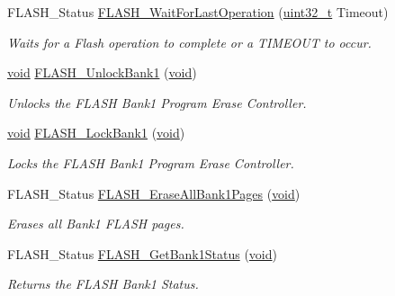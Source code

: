 \begin{DoxyCompactItemize}
F\-L\-A\-S\-H\-\_\-\-Status \hyperlink{group___f_l_a_s_h___exported___functions_ga2ad803999ae93ec03700983c59cae264}{F\-L\-A\-S\-H\-\_\-\-Wait\-For\-Last\-Operation} (\hyperlink{stdint_8h_a435d1572bf3f880d55459d9805097f62}{uint32\-\_\-t} Timeout)
\begin{DoxyCompactList}\small\item\em Waits for a Flash operation to complete or a T\-I\-M\-E\-O\-U\-T to occur. \end{DoxyCompactList}\item 
\hyperlink{group___n_a_m_e_ga18028b8badbf1ea7e704ccac3c488e82}{void} \hyperlink{group___f_l_a_s_h___exported___functions_ga358c4b7e0ef20693ca62cc9d20c94a5a}{F\-L\-A\-S\-H\-\_\-\-Unlock\-Bank1} (\hyperlink{group___n_a_m_e_ga18028b8badbf1ea7e704ccac3c488e82}{void})
\begin{DoxyCompactList}\small\item\em Unlocks the F\-L\-A\-S\-H Bank1 Program Erase Controller. \end{DoxyCompactList}\item 
\hyperlink{group___n_a_m_e_ga18028b8badbf1ea7e704ccac3c488e82}{void} \hyperlink{group___f_l_a_s_h___exported___functions_gafe4188ab9eb12c046970660f65a3faf9}{F\-L\-A\-S\-H\-\_\-\-Lock\-Bank1} (\hyperlink{group___n_a_m_e_ga18028b8badbf1ea7e704ccac3c488e82}{void})
\begin{DoxyCompactList}\small\item\em Locks the F\-L\-A\-S\-H Bank1 Program Erase Controller. \end{DoxyCompactList}\item 
F\-L\-A\-S\-H\-\_\-\-Status \hyperlink{group___f_l_a_s_h___exported___functions_ga2036728450ee18e789b25fe3fd9c80ee}{F\-L\-A\-S\-H\-\_\-\-Erase\-All\-Bank1\-Pages} (\hyperlink{group___n_a_m_e_ga18028b8badbf1ea7e704ccac3c488e82}{void})
\begin{DoxyCompactList}\small\item\em Erases all Bank1 F\-L\-A\-S\-H pages. \end{DoxyCompactList}\item 
F\-L\-A\-S\-H\-\_\-\-Status \hyperlink{group___f_l_a_s_h___exported___functions_ga9d5b76b75ef4c578cc45dc836a1929b6}{F\-L\-A\-S\-H\-\_\-\-Get\-Bank1\-Status} (\hyperlink{group___n_a_m_e_ga18028b8badbf1ea7e704ccac3c488e82}{void})
\begin{DoxyCompactList}\small\item\em Returns the F\-L\-A\-S\-H Bank1 Status. \end{DoxyCompactList}\item 

\end{DoxyCompactItemize}
